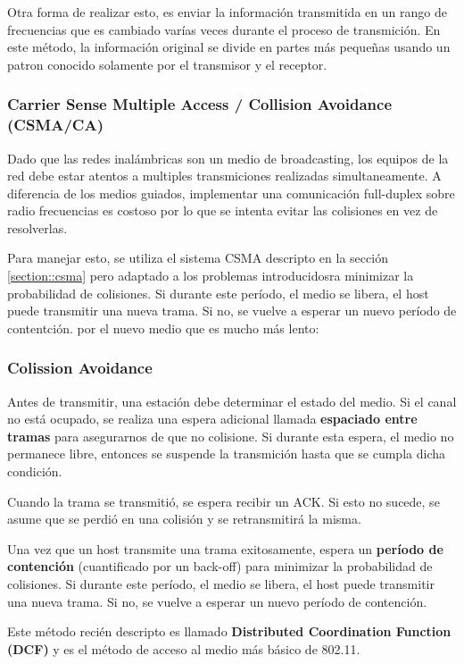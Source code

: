 Otra forma de realizar esto, es enviar la información transmitida en un rango de frecuencias que es cambiado varías veces durante el proceso de transmición. En este método, la información original se divide en partes más pequeñas usando un patron conocido solamente por el transmisor y el receptor.

\subsubsection{Carrier Sense Multiple Access / Collision Avoidance (CSMA/CA)}

Dado que las redes inalámbricas son un medio de broadcasting, los equipos de la red debe estar atentos a multiples transmiciones realizadas simultaneamente. 
A diferencia de los medios guiados, implementar una comunicación full-duplex sobre radio frecuencias es costoso por lo que se intenta evitar las colisiones en vez de resolverlas.

Para manejar esto, se utiliza el sistema CSMA descripto en la sección \ref{section::csma} pero adaptado a los problemas introducidosra minimizar la probabilidad de colisiones. Si durante este período, el medio se libera, el host puede transmitir una nueva trama. Si no, se vuelve a esperar un nuevo período de contentción. por el nuevo medio que es mucho más lento:

\subsubsection*{Colission Avoidance}
Antes de transmitir, una estación debe determinar el estado del medio. Si el canal no está ocupado, se realiza una espera adicional llamada \textbf{espaciado entre tramas} para asegurarnos de que no colisione.  Si durante esta espera, el medio no permanece libre, entonces se suspende la transmición hasta que se cumpla dicha condición.

Cuando la trama se transmitió, se espera recibir un ACK. Si esto no sucede, se asume que se perdió en una colisión y se retransmitirá la misma. 

Una vez que un host transmite una trama exitosamente, espera un \textbf{período de contención} (cuantificado por un back-off) para minimizar la probabilidad de colisiones. Si durante este período, el medio se libera, el host puede transmitir una nueva trama. Si no, se vuelve a esperar un nuevo período de contención.

Este método recién descripto es llamado \textbf{Distributed Coordination Function (DCF)} y es el método de acceso al medio más básico de 802.11.


